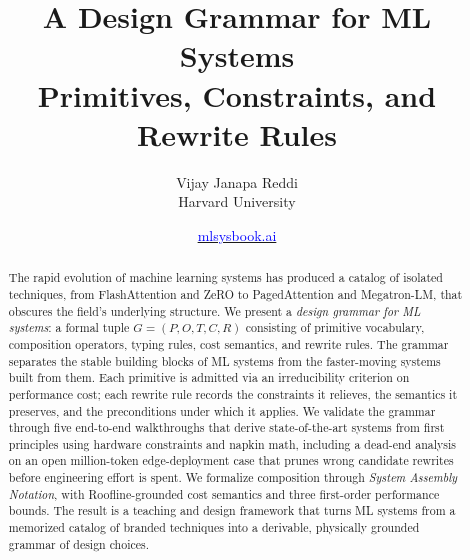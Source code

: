 \documentclass[10pt,twocolumn]{article}
\newcommand{\hrefurl}[2]{\href{#1}{\textcolor{blue}{#2}}}
\begin{document}
\title{
  \textbf{A Design Grammar for ML Systems}\\[0.3em]
  {\large Primitives, Constraints, and Rewrite Rules}
}

\author{
  Vijay Janapa Reddi\\
  Harvard University
}

\date{\hrefurl{https://mlsysbook.ai}{mlsysbook.ai}}

\maketitle
\begingroup
\renewcommand{\thefootnote}{}%
%
\endgroup

\begin{abstract}
The rapid evolution of machine learning systems has produced a catalog of isolated techniques, from FlashAttention and ZeRO to PagedAttention and Megatron-LM, that obscures the field's underlying structure. We present a \emph{design grammar for ML systems}: a formal tuple $G=(P,O,T,C,R)$ consisting of primitive vocabulary, composition operators, typing rules, cost semantics, and rewrite rules. The grammar separates the stable building blocks of ML systems from the faster-moving systems built from them. Each primitive is admitted via an irreducibility criterion on performance cost; each rewrite rule records the constraints it relieves, the semantics it preserves, and the preconditions under which it applies. We validate the grammar through five end-to-end walkthroughs that derive state-of-the-art systems from first principles using hardware constraints and napkin math, including a dead-end analysis on an open million-token edge-deployment case that prunes wrong candidate rewrites before engineering effort is spent. We formalize composition through \emph{System Assembly Notation}, with Roofline-grounded cost semantics and three first-order performance bounds. The result is a teaching and design framework that turns ML systems from a memorized catalog of branded techniques into a derivable, physically grounded grammar of design choices.
\end{abstract}
\end{document}
